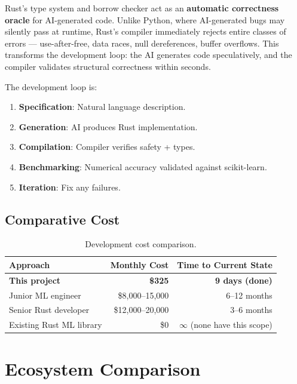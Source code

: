 \documentclass[11pt,a4paper]{article}
\begin{document}
\begin{novelty}
Rust's type system and borrow checker act as an \textbf{automatic
correctness oracle} for AI-generated code. Unlike Python, where
AI-generated bugs may silently pass at runtime, Rust's compiler
immediately rejects entire classes of errors --- use-after-free, data
races, null dereferences, buffer overflows. This transforms the
development loop: the AI generates code speculatively, and the compiler
validates structural correctness within seconds.
\end{novelty}

The development loop is:
\begin{enumerate}[nosep]
    \item \textbf{Specification}: Natural language description.
    \item \textbf{Generation}: AI produces Rust implementation.
    \item \textbf{Compilation}: Compiler verifies safety + types.
    \item \textbf{Benchmarking}: Numerical accuracy validated against
          scikit-learn.
    \item \textbf{Iteration}: Fix any failures.
\end{enumerate}

\subsection{Comparative Cost}

\begin{table}[H]
\centering
\caption{Development cost comparison.}
\begin{tabular}{lrr}
\toprule
\textbf{Approach} & \textbf{Monthly Cost} & \textbf{Time to Current State} \\
\midrule
\textbf{This project} & \textbf{\$325} & \textbf{9 days (done)} \\
Junior ML engineer & \$8,000--15,000 & 6--12 months \\
Senior Rust developer & \$12,000--20,000 & 3--6 months \\
Existing Rust ML library & \$0 & $\infty$ (none have this scope) \\
\bottomrule
\end{tabular}
\end{table}

\section{Ecosystem Comparison}
\end{document}
